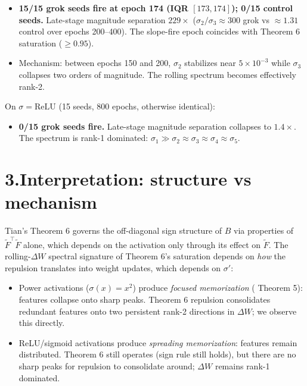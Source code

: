 \documentclass[11pt]{article}
\newcommand{\Ftil}{\widetilde{F}}
\begin{document}
\begin{itemize}[leftmargin=*, itemsep=2pt]
\item \textbf{15/15 grok seeds fire at epoch 174 (IQR $[173, 174]$);
0/15 control seeds.} Late-stage magnitude separation $229\times$
($\sigma_2/\sigma_3 \approx 300$ grok vs $\approx 1.31$ control over
epochs 200--400). The slope-fire epoch coincides with Theorem 6
saturation ($\ge 0.95$).
\item Mechanism: between epochs 150 and 200, $\sigma_2$ stabilizes near
$5\!\times\!10^{-3}$ while $\sigma_3$ collapses two orders of magnitude.
The rolling spectrum becomes effectively rank-2.
\end{itemize}

On $\sigma=\mathrm{ReLU}$ (15 seeds, 800 epochs, otherwise identical):

\begin{itemize}[leftmargin=*, itemsep=2pt]
\item \textbf{0/15 grok seeds fire.} Late-stage magnitude separation
collapses to $1.4\times$. The spectrum is rank-1 dominated:
$\sigma_1 \gg \sigma_2 \approx \sigma_3 \approx \sigma_4 \approx \sigma_5$.
\end{itemize}

\section*{3.\quad Interpretation: structure vs mechanism}
\vspace{-0.4em}

Tian's Theorem 6 governs the off-diagonal sign structure of $B$ via
properties of $\Ftil^\top\Ftil$ alone, which depends on the activation
only through its effect on $\Ftil$. The rolling-$\Delta W$ spectral
signature of Theorem 6's saturation depends on \emph{how} the repulsion
translates into weight updates, which depends on $\sigma'$:
\begin{itemize}[leftmargin=*, itemsep=2pt]
\item Power activations ($\sigma(x){=}x^2$) produce \emph{focused
memorization} (\citealp{tian2025li2} Theorem 5): features collapse onto
sharp peaks. Theorem 6 repulsion consolidates redundant features onto
two persistent rank-2 directions in $\Delta W$; we observe this directly.
\item ReLU/sigmoid activations produce \emph{spreading memorization}:
features remain distributed. Theorem 6 still operates (sign rule still
holds), but there are no sharp peaks for repulsion to consolidate around;
$\Delta W$ remains rank-1 dominated.
\end{itemize}
\end{document}
